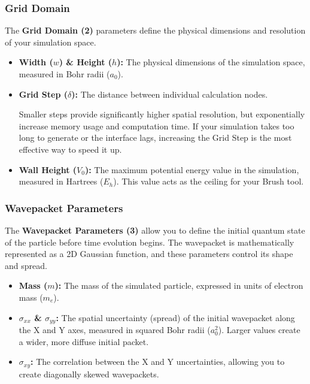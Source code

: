 \documentclass[11pt, a4paper]{article}
\begin{document}
\subsubsection{Grid Domain}
The \textbf{Grid Domain (2)} parameters define the physical dimensions and resolution of your simulation space.
\begin{itemize}
    \item \textbf{Width ($w$) \& Height ($h$):} The physical dimensions of the simulation space, measured in Bohr radii ($a_0$).
    \item \textbf{Grid Step ($\delta$):} The distance between individual calculation nodes.
    
    \begin{Note}
    Smaller steps provide significantly higher spatial resolution, but exponentially increase memory usage and computation time. If your simulation takes too long to generate or the interface lags, increasing the Grid Step is the most effective way to speed it up.
    \end{Note}
    
    \item \textbf{Wall Height ($V_0$):} The maximum potential energy value in the simulation, measured in Hartrees ($E_h$). This value acts as the ceiling for your Brush tool.
\end{itemize}

\subsubsection{Wavepacket Parameters}
The \textbf{Wavepacket Parameters (3)} allow you to define the initial quantum state of the particle before time evolution begins. The wavepacket is mathematically represented as a 2D Gaussian function, and these parameters control its shape and spread.
\begin{itemize}
    \item \textbf{Mass ($m$):} The mass of the simulated particle, expressed in units of electron mass ($m_e$).
    \item \textbf{$\sigma_{xx}$ \& $\sigma_{yy}$:} The spatial uncertainty (spread) of the initial wavepacket along the X and Y axes, measured in squared Bohr radii ($a_0^2$). Larger values create a wider, more diffuse initial packet.
    \item \textbf{$\sigma_{xy}$:} The correlation between the X and Y uncertainties, allowing you to create diagonally skewed wavepackets.
\end{itemize}
\end{document}
